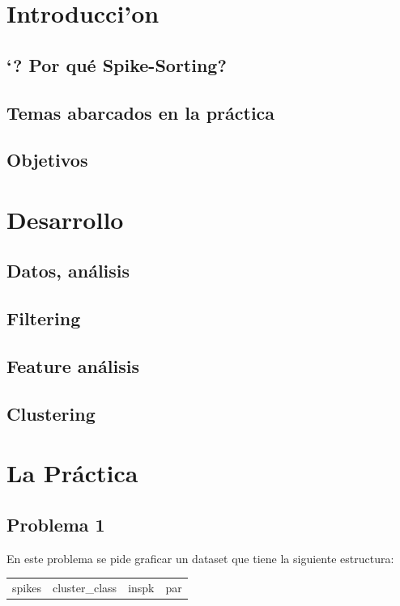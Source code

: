 \documentclass[a4paper,spanish]{article}
\begin{document}




\section{Introducci'on}
\subsection{`? Por qu\'e Spike-Sorting?}

\subsection{Temas abarcados en la pr\'actica}

\subsection{Objetivos}

\section{Desarrollo}
\subsection{Datos, an\'alisis}
\subsection{Filtering}
\subsection{Feature an\'alisis}
\subsection{Clustering}


\section{La Pr\'actica}
\subsection{Problema 1}
En este problema se pide graficar un dataset que tiene la siguiente estructura:
\begin{tabular}{ c | c | c | c}
	spikes & cluster\_class & inspk & par \\
\end{tabular}
\end{document}
